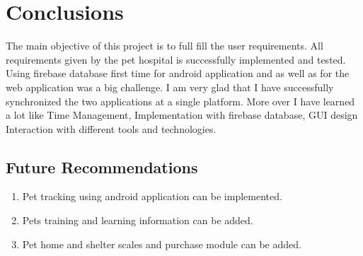 \chapter{Conclusions}\label{chap:conclusions}

The main objective of this project is to full fill the user requirements. All requirements given by the pet hospital is successfully implemented and tested. Using firebase database first time for android application and as well as for the web application was a big challenge. I am very glad that I have successfully synchronized the two applications at a single platform. More over I have learned a lot like Time Management, Implementation with firebase database, GUI design Interaction with different tools and technologies.
\section{Future Recommendations}
\begin{enumerate}
	\item Pet tracking using android application can be implemented.
	\item Pets training and learning information can be added.
	\item Pet home and shelter scales and purchase module can be added.
\end{enumerate}
